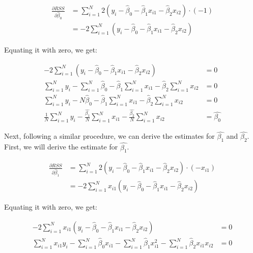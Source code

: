 \documentclass{article}
\begin{document}
\begin{equation}
  \begin{split}
     \frac{\partial RSS}{\partial \hat{\beta}_0} &= \sum_{i=1}^N 2 \left( y_i - \hat{\beta}_0 - \hat{\beta}_1 x_{i1} - \hat{\beta}_2 x_{i2} \right) \cdot (-1) \\
      &= -2 \sum_{i=1}^N \left( y_i - \hat{\beta}_0 - \hat{\beta}_1 x_{i1} - \hat{\beta}_2 x_{i2} \right)
  \end{split}
\end{equation}

Equating it with zero, we get:

\begin{equation}
  \label{eqn:beta0}
  \begin{split}
      -2 \sum_{i=1}^N \left( y_i - \hat{\beta}_0 - \hat{\beta}_1 x_{i1} - \hat{\beta}_2x_{i2} \right) &= 0 \\
      \sum_{i=1}^N y_i -  \sum_{i=1}^N \hat{\beta}_0 -  \hat{\beta}_1  \sum_{i=1}^N x_{i1} - \hat{\beta}_2  \sum_{i=1}^N x_{i2} &= 0 \\
      \sum_{i=1}^N y_i -  N\hat{\beta}_0 -  \hat{\beta}_1  \sum_{i=1}^N x_{i1} - \hat{\beta}_2  \sum_{i=1}^N x_{i2} &= 0 \\
      \frac{1}{N}\sum_{i=1}^{N} y_i - \frac{\hat{\beta_1}}{N}\sum_{i=1}^{N}x_{i1} - \frac{\hat{\beta_2}}{N}\sum_{i=1}^{N}x_{i2} &= \hat{\beta_0} 
  \end{split}
\end{equation}

Next, following a similar procedure, we can derive the estimates for $\hat{\beta_1}$ and $\hat{\beta_2}$. First, we will derive the estimate for $\hat{\beta_1}$.

\begin{equation}
  \begin{split}
     \frac{\partial RSS}{\partial \hat{\beta}_1} &= \sum_{i=1}^N 2 \left( y_i - \hat{\beta}_0 - \hat{\beta}_1 x_{i1} - \hat{\beta}_2 x_{i2} \right) \cdot (-x_{i1}) \\
      &= -2 \sum_{i=1}^N x_{i1} \left( y_i - \hat{\beta}_0 - \hat{\beta}_1 x_{i1} - \hat{\beta}_2 x_{i2} \right)
  \end{split}
\end{equation}

Equating it with zero, we get:

\begin{equation}
    \begin{split}
       -2 \sum_{i=1}^N x_{i1} \left( y_i - \hat{\beta}_0 - \hat{\beta}_1 x_{i1} - \hat{\beta}_2 x_{i2} \right) &= 0 \\
       \sum_{i=1}^N x_{i1} y_i - \sum_{i=1}^N \hat{\beta}_0 x_{i1} - \sum_{i=1}^N \hat{\beta}_1 x_{i1}^2 - \sum_{i=1}^N \hat{\beta}_2 x_{i1} x_{i2} &= 0
    \end{split}
\end{equation}
\end{document}
